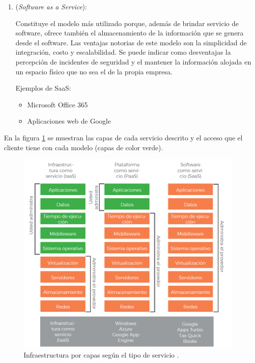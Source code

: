 \begin{enumerate}
\item {} (\emph{Software as a Service}): 

Constituye el modelo más utilizado porque, además de brindar servicio de software, ofrece también el almacenamiento de la información que se genera desde el software. Las ventajas notorias de este modelo son la simplicidad de integración, costo y escalabilidad. Se puede indicar como desventajas la percepción de incidentes de seguridad y el mantener la información alojada en un espacio físico que no sea el de la propia empresa. 

Ejemplos de SaaS:

\begin{itemize}
\item Microsoft Office 365
\item Aplicaciones web de Google
\end{itemize}

\vspace{0.5cm}

\end{enumerate}

En la figura \ref{fig:capas-servicios} se muestran las capas de cada servicio descrito y el acceso que el cliente tiene con cada modelo (capas de color verde).

\begin{figure}[htbp]
	\centering
	\includegraphics[width=.8\textwidth]{./Figures/capas-servicios.png}
	\caption{Infraestructura por capas según el tipo de servicio  \protect\footnotemark.}

	\label{fig:capas-servicios}
\end{figure}

